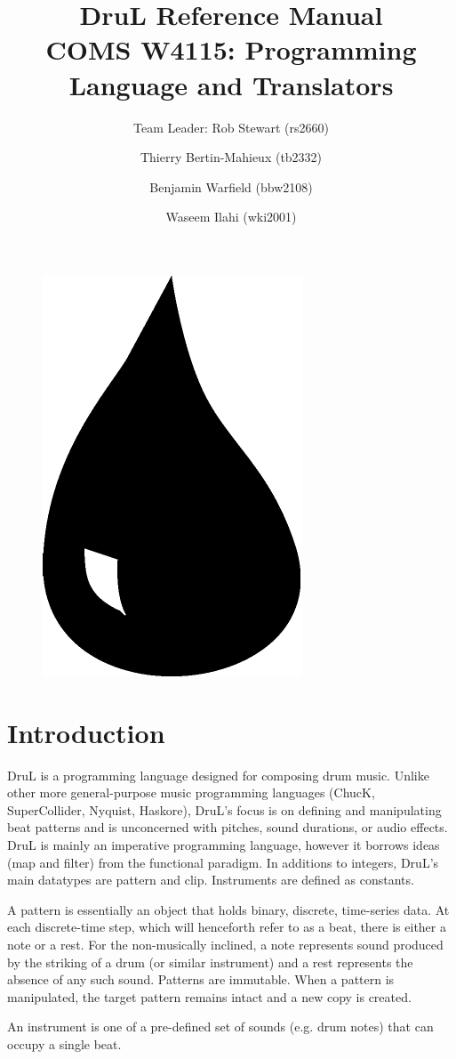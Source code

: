 \documentclass[11pt,twoside]{article}
\title{\textbf{DruL} Reference Manual\\
\vspace{1cm}
COMS W4115: Programming Language and Translators}
\author{Team Leader: Rob Stewart (rs2660) \and Thierry Bertin-Mahieux (tb2332) \and Benjamin Warfield (bbw2108) \and Waseem Ilahi (wki2001)}
\begin{document}
\maketitle
\begin{center}
\end{center}

\vspace{3cm}

\begin{figure}[h]
\begin{center}
\includegraphics[width=.2\columnwidth]{Water_Drop.pdf}
\end{center}
\end{figure}


\newpage


\section{Introduction}
DruL is a programming language designed for composing drum music.  Unlike other more general-purpose music programming languages (ChucK, SuperCollider, Nyquist, Haskore), DruL's focus is on defining and manipulating beat patterns and is unconcerned with pitches, sound durations, or audio effects.  DruL is mainly an imperative programming language, however it borrows ideas (map and filter) from the functional paradigm.  In additions to integers, DruL's main datatypes are pattern and clip. Instruments are defined as constants.

A pattern is essentially an object that holds binary, discrete, time-series data.  At each discrete-time step, which will henceforth refer to as a beat, there is either a note or a rest.  For the non-musically inclined, a note represents sound produced by the striking of a drum (or similar instrument) and a rest represents the absence of any such sound.  Patterns are immutable.  When a pattern is manipulated, the target pattern remains intact and a new copy is created.

An instrument is one of a pre-defined set of sounds (e.g. drum notes) that can occupy a single beat.
\end{document}

